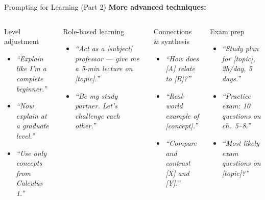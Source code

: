 \documentclass[aspectratio=169]{beamer}
\begin{document}
\begin{frame}{Prompting for Learning (Part 2)}
\small
\textbf{\color{popblue}More advanced techniques:}

\smallskip
\begin{columns}[T]
\begin{block}{Level adjustment}
\begin{itemize}\setlength\itemsep{0em}
  \item \textit{``Explain like I'm a complete beginner.''}
  \item \textit{``Now explain at a graduate level.''}
  \item \textit{``Use only concepts from Calculus 1.''}
\end{itemize}
\end{block}

\smallskip
\begin{block}{Role-based learning}
\begin{itemize}\setlength\itemsep{0em}
  \item \textit{``Act as a [subject] professor --- give me a 5-min lecture on [topic].''}
  \item \textit{``Be my study partner. Let's challenge each other.''}
\end{itemize}
\end{block}

\begin{block}{Connections \& synthesis}
\begin{itemize}\setlength\itemsep{0em}
  \item \textit{``How does [A] relate to [B]?''}
  \item \textit{``Real-world example of [concept].''}
  \item \textit{``Compare and contrast [X] and [Y].''}
\end{itemize}
\end{block}

\smallskip
\begin{block}{Exam prep}
\begin{itemize}\setlength\itemsep{0em}
  \item \textit{``Study plan for [topic], 2h/day, 5 days.''}
  \item \textit{``Practice exam: 10 questions on ch.\ 5--8.''}
  \item \textit{``Most likely exam questions on [topic]?''}
\end{itemize}
\end{block}
\end{columns}
\end{frame}
\end{document}
